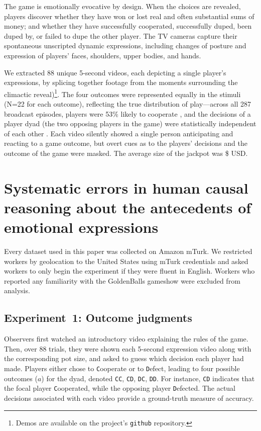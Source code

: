 \documentclass[10pt,letterpaper]{article}
\newcommand{\C}{\texttt{C}\xspace}
\newcommand{\D}{\texttt{D}\xspace}
\newcommand{\CC}{\texttt{CC}\xspace}
\newcommand{\CD}{\texttt{CD}\xspace}
\newcommand{\DC}{\texttt{DC}\xspace}
\newcommand{\DD}{\texttt{DD}\xspace}
\begin{document}
The game is emotionally evocative by design. When the choices are revealed, players discover whether they have won or lost real and often substantial sums of money; and whether they have successfully cooperated, successfully duped, been duped by, or failed to dupe the other player. The TV cameras capture their spontaneous unscripted dynamic expressions, including changes of posture and expression of players' faces, shoulders, upper bodies, and hands.

We extracted 88 unique 5-second videos, each depicting a single player's expressions, by splicing together footage from the moments surrounding the climactic reveal)\footnote{Demos are available on the project's \texttt{github} repository.}.
The four outcomes were represented equally in the stimuli (N=22 for each outcome), reflecting the true distribution of play---across all 287 broadcast episodes, players were 53\% likely to cooperate \citep{vandenAssem2012goldenballs}, and the decisions of a player dyad (the two opposing players in the game) were statistically independent of each other \citep{burtonchellew2012goldenballs}.
Each video silently showed a single person anticipating and reacting to a game outcome, but overt cues as to the players' decisions and the outcome of the game were masked.
The average size of the jackpot was \$ USD.


\section{Systematic errors in human causal reasoning about the antecedents of emotional expressions}

Every dataset used in this paper was collected on Amazon mTurk. We restricted workers by geolocation to the United States using mTurk credentials and asked workers to only begin the experiment if they were fluent in English. Workers who reported any familiarity with the GoldenBalls gameshow were excluded from analysis.


\subsection{Experiment~1: Outcome judgments}

Observers first watched an introductory video explaining the rules of the game. Then, over 88 trials, they were shown each 5-second expression video along with the corresponding pot size, and asked to guess which decision each player had made. Players either chose to \C{}ooperate or to \D{}efect, leading to four possible outcomes ($a$) for the dyad, denoted \CC, \CD, \DC, \DD. For instance, \CD indicates that the focal player \C{}ooperated, while the opposing player \D{}efected. The actual decisions associated with each video provide a ground-truth measure of accuracy. 
\end{document}

